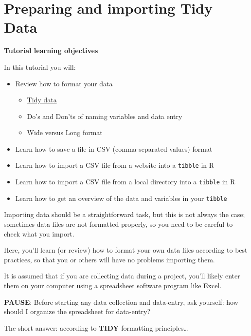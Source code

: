 \documentclass[
]{book}
\providecommand{\tightlist}{%
  \setlength{\itemsep}{0pt}\setlength{\parskip}{0pt}}
\begin{document}
\chapter{Preparing and importing Tidy Data}\label{data_import}

\textbf{Tutorial learning objectives}

In this tutorial you will:

\begin{itemize}
\tightlist
\item
  Review how to format your data

  \begin{itemize}
  \tightlist
  \item
    \href{https://ubco-biology.github.io/Procedures-and-Guidelines/tidy-data.html}{Tidy data}
  \item
    Do's and Don'ts of naming variables and data entry
  \item
    Wide versus Long format
  \end{itemize}
\item
  Learn how to save a file in CSV (comma-separated values) format\\
\item
  Learn how to import a CSV file from a website into a \texttt{tibble} in R\\
\item
  Learn how to import a CSV file from a local directory into a \texttt{tibble} in R\\
\item
  Learn how to get an overview of the data and variables in your \texttt{tibble}
\end{itemize}

Importing data should be a straightforward task, but this is not always the case; sometimes data files are not formatted properly, so you need to be careful to check what you import.

Here, you'll learn (or review) how to format your own data files according to best practices, so that you or others will have no problems importing them.

It is assumed that if you are collecting data during a project, you'll likely enter them on your computer using a spreadsheet software program like Excel.

\textbf{PAUSE}: Before starting any data collection and data-entry, ask yourself: how should I organize the spreadsheet for data-entry?

The short answer: according to \textbf{TIDY} formatting principles\ldots{}
\end{document}
